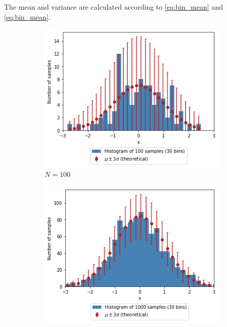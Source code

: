 \documentclass[a4paper]{article}
\begin{document}
The mean and variance are calculated according to \autoref{eq:bin_mean} and \autoref{eq:bin_mean}.

\begin{figure}[h]
    \centering
    \begin{subfigure}[b]{0.3\textwidth}
        \centering
        \includegraphics[width=\textwidth]{figures/gaussian_histogram_100.png}
        \caption{$N=100$}
        \label{fig:gaussian_histogram_100}
    \end{subfigure}
    \hfill
    \begin{subfigure}[b]{0.3\textwidth}
        \centering
        \includegraphics[width=\textwidth]{figures/gaussian_histogram_1000.png}

\end{subfigure}
\end{figure}
\end{document}
